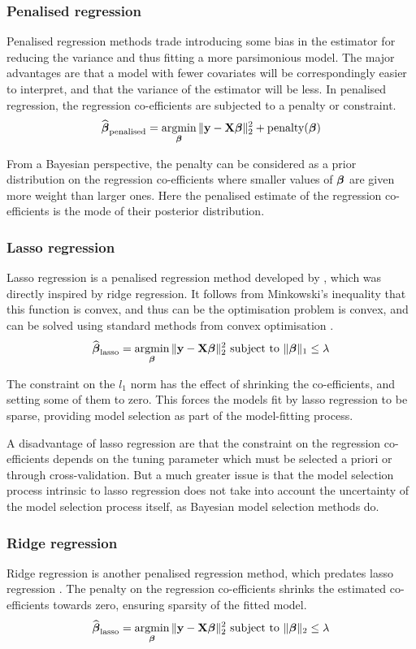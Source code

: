 \subsubsection{Penalised regression}
Penalised regression methods trade introducing some bias in the estimator for reducing the variance and thus
fitting a more parsimonious model. The major advantages are that a model with fewer covariates will be
correspondingly easier to interpret, and that the variance of the estimator will be less. In penalised
regression, the regression co-efficients are subjected to a penalty or constraint.
$$
\widehat{\vbeta}_{\text{penalised}} = \argmin_\vbeta \|\vy - \mX \vbeta\|_2^2 + \text{penalty}(\vbeta)
$$

From a Bayesian perspective, the penalty can be considered as a prior distribution on the regression 
co-efficients where smaller values of ${\boldsymbol \beta}$ are given more weight than larger ones. Here the penalised
estimate of the regression co-efficients is the mode of their posterior distribution.

\subsubsection{Lasso regression}
Lasso regression is a penalised regression method developed by \citep{Tibshirani1996}, which was directly
inspired by ridge regression. It follows from Minkowski's inequality that this function is convex, and thus
can be the optimisation problem is convex, and can be solved using standard methods from convex optimisation
\citep{Boyd2010}.
$$
\widehat{\vbeta}_{\text{lasso}} = \argmin_\vbeta \|\vy - \mX \vbeta\|_2^2 \text{ subject to } \|\vbeta\|_1 \leq \lambda
$$

The constraint on the $l_1$ norm has the effect of shrinking the co-efficients, and setting some of them to
zero. This forces the models fit by lasso regression to be sparse, providing model selection as part of the
model-fitting process.

A disadvantage of lasso regression are that the constraint on the regression co-efficients depends on the
tuning parameter which must be selected a priori or through cross-validation. But a much greater issue is that
the model selection process intrinsic to lasso regression does not take into account the uncertainty of the
model selection process itself, as Bayesian model selection methods do.

\subsubsection{Ridge regression}
Ridge regression is another penalised regression method, which predates lasso regression
\cite{Hoerl1970}. The penalty on the regression co-efficients shrinks the estimated co-efficients towards
zero, ensuring sparsity of the fitted model.
$$
\widehat{\vbeta}_{\text{lasso}} = \argmin_\vbeta \|\vy - \mX \vbeta\|_2^2 \text{ subject to } \|\vbeta\|_2 \leq \lambda
$$

